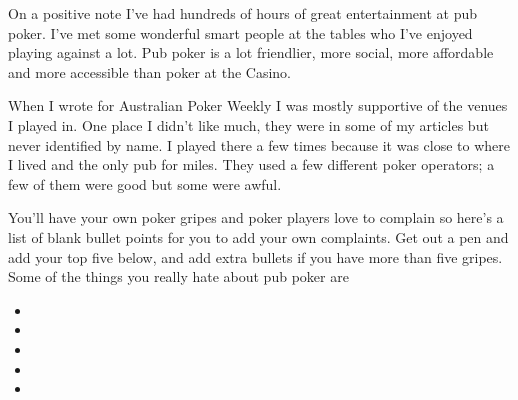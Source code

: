 On a positive note I've
had hundreds of hours of great entertainment at pub poker. I've
met some wonderful smart people at the tables who I've enjoyed playing
against a lot. Pub poker is a lot friendlier, more social, more affordable
and more accessible than poker at the Casino.

When I wrote for Australian Poker Weekly I was mostly supportive of
the venues I played in. One place I didn't like much, they were in
some of my articles but never identified by name. I played there a few
times because it was close to where I lived and the only pub for
miles. They used a few different poker operators; a few of them were
good but some were awful.

You'll have your own poker gripes and poker players love to complain
so here's a list of blank bullet points for you to add your own
complaints. Get out a pen and add your top five below, and add extra
bullets if you have more than five gripes. Some of the things you
really hate about pub poker are

\begin{itemize}

\item


\item


\item


\item


\item


\end{itemize}
